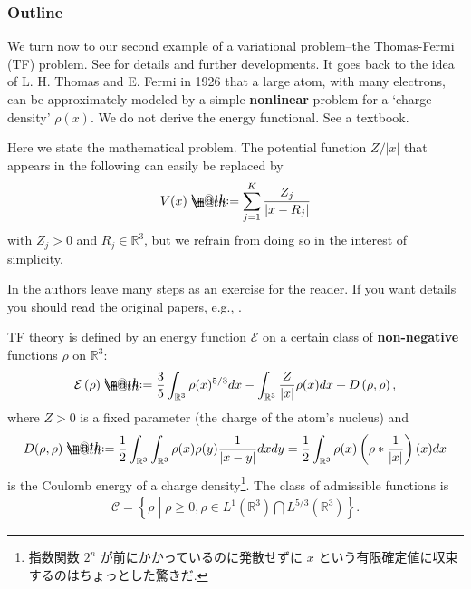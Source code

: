 \documentclass[openany, a4paper, oneside]{jsbook}
\makeatletter
\newcommand*{\defeq}{\mathrel{\rlap{%
\raisebox{0.3ex}{$\m@th\cdot$}}%
\raisebox{-0.3ex}{$\m@th\cdot$}}%
=}
\theoremstyle{break}
\theoremstyle{breakdefn}
\newcommand{\abs}[1]{\left|#1\right|}
\newcommand{\rbk}[1]{\left (#1\right)}
\newcommand{\relmiddle}[1]{\mathrel{}\middle#1\mathrel{}}
\newcommand{\set}[2]{\left\{#1 \relmiddle| #2\right\}}
\newcommand{\bbRthree}{\mathbb{R}^3}
\newcommand{\calC}{\mathcal{C}}
\newcommand{\calE}{\mathcal{E}}
\makeatother
\begin{document}
\subsubsection{Outline}


We turn now to our second example of a variational problem--the Thomas-Fermi (TF) problem.
See \cite{LiebSimon1} for details and further developments.
It goes back to the idea of L. H. Thomas and E. Fermi in 1926 that a large atom,
with many electrons, can be approximately modeled by a simple \textbf{nonlinear} problem for a
`charge density' $\rho (x)$.
We do not derive the energy functional.
See a textbook.

Here we state the mathematical problem.
The potential function $Z / \abs{x}$ that appears in the following can easily be replaced by
\begin{align}
 V (x)
 \defeq
 \sum_{j=1}^{K} \frac{Z_j}{\abs{x - R_j}}
\end{align}
with $Z_j > 0$ and $R_j \in \bbRthree$, but we refrain from doing so in the interest of simplicity.

In \cite{LiebLoss1} the authors leave many steps as an exercise for the reader.
If you want details you should read the original papers, e.g., \cite{LiebSimon1}.

TF theory is defined by an energy function $\calE$ on a certain class of \textbf{non-negative} functions $\rho$ on $\bbRthree$:
\begin{align}
 \calE \rbk{\rho}
 \defeq
 \frac{3}{5} \int_{\bbRthree} \rho (x)^{5/3} dx - \int_{\bbRthree} \frac{Z}{\abs{x}} \rho (x) dx + D \rbk{\rho, \rho}, \label{Lieb-Loss_Analysis_chap11_17}
\end{align}
where $Z > 0$ is a fixed parameter (the charge of the atom's nucleus) and
\begin{align}
 D (\rho, \rho)
 \defeq
 \frac{1}{2} \int_{\bbRthree} \int_{\bbRthree} \rho (x) \rho (y) \frac{1}{\abs{x - y}} dx dy
 =
 \frac{1}{2} \int_{\bbRthree} \rho (x) \rbk{\rho * \frac{1}{\abs{x}}}(x) dx
\end{align}
is the Coulomb energy of a charge density\footnote{指数関数 $2^n$ が前にかかっているのに発散せずに $x$ という有限確定値に収束するのはちょっとした驚きだ.
 }.
The class of admissible functions is
\begin{align}
 \calC
 =
 \set{\rho}{\rho \geq 0, \rho \in L^1 \rbk{\bbRthree} \bigcap L^{5/3} \rbk{\bbRthree}}.
\end{align}
\end{document}
